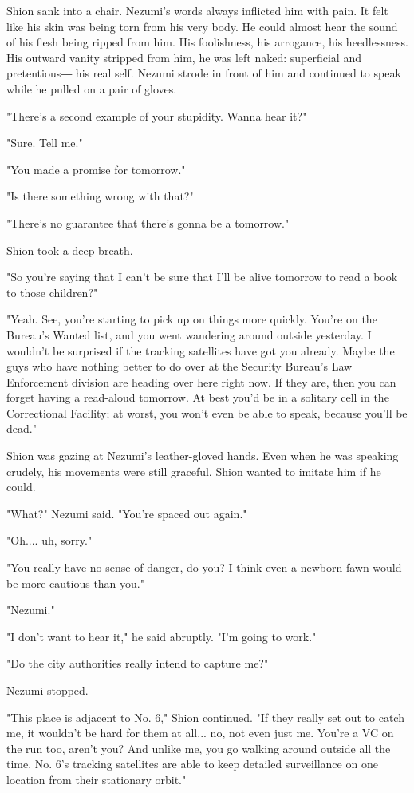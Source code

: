 Shion sank into a chair. Nezumi's words always inflicted him with pain.
It felt like his skin was being torn from his very body. He could almost
hear the sound of his flesh being ripped from him. His foolishness, his
arrogance, his heedlessness. His outward vanity stripped from him, he
was left naked: superficial and pretentious― his real self. Nezumi
strode in front of him and continued to speak while he pulled on a pair
of gloves.

"There's a second example of your stupidity. Wanna hear it?"

"Sure. Tell me."

"You made a promise for tomorrow."

"Is there something wrong with that?"

"There's no guarantee that there's gonna be a tomorrow."

Shion took a deep breath.

"So you're saying that I can't be sure that I'll be alive tomorrow to
read a book to those children?"

"Yeah. See, you're starting to pick up on things more quickly. You're on
the Bureau's Wanted list, and you went wandering around outside
yesterday. I wouldn't be surprised if the tracking satellites have got
you already. Maybe the guys who have nothing better to do over at the
Security Bureau's Law Enforcement division are heading over here right
now. If they are, then you can forget having a read-aloud tomorrow. At
best you'd be in a solitary cell in the Correctional Facility; at worst,
you won't even be able to speak, because you'll be dead."

Shion was gazing at Nezumi's leather-gloved hands. Even when he was
speaking crudely, his movements were still graceful. Shion wanted to
imitate him if he could.

"What?" Nezumi said. "You're spaced out again."

"Oh.... uh, sorry."

"You really have no sense of danger, do you? I think even a newborn fawn
would be more cautious than you."

"Nezumi."

"I don't want to hear it," he said abruptly. "I'm going to work."

"Do the city authorities really intend to capture me?"

Nezumi stopped.

"This place is adjacent to No. 6," Shion continued. "If they really set
out to catch me, it wouldn't be hard for them at all... no, not even
just me. You're a VC on the run too, aren't you? And unlike me, you go
walking around outside all the time. No. 6's tracking satellites are
able to keep detailed surveillance on one location from their stationary
orbit."

